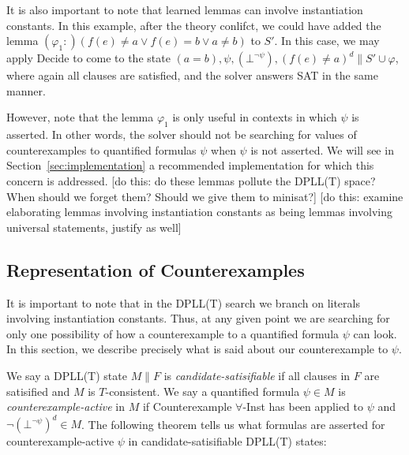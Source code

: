 \documentclass{llncs}
\begin{document}
It is also important to note that learned lemmas can involve instantiation constants.
In this example, after the theory conlifct, we could have added the lemma $(\varphi_1 : ) ( f( e ) \neq a \vee f( e ) = b \vee a \neq b )$ to $S'$.
In this case, we may apply Decide to come to the state $( a = b ), \psi, (\bot^{\neg \psi}), (f( e ) \neq a)^d \parallel S' \cup \varphi$, where again all clauses are satisfied, and the solver answers SAT in the same manner.

However, note that the lemma $\varphi_1$ is only useful in contexts in which $\psi$ is asserted.
In other words, the solver should not be searching for values of counterexamples to quantified formulas $\psi$ when $\psi$ is not asserted.
We will see in Section~\ref{sec:implementation} a recommended implementation for which this concern is addressed.
[do this: do these lemmas pollute the DPLL(T) space?  When should we forget them?  Should we give them to minisat?]
[do this: examine elaborating lemmas involving instantiation constants as being lemmas involving universal statements, justify as well]

\subsection{Representation of Counterexamples}

It is important to note that in the DPLL(T) search we branch on literals involving instantiation constants.
Thus, at any given point we are searching for only one possibility of how a counterexample to a quantified formula $\psi$ can look.
In this section, we describe precisely what is said about our counterexample to $\psi$.

We say a DPLL(T) state $M \parallel F$ is \emph{candidate-satisifiable} if all clauses in $F$ are satisified and $M$ is $T$-consistent.
We say a quantified formula $\psi \in M$ is \emph{counterexample-active} in $M$ if Counterexample $\forall$-Inst has been applied to $\psi$ and $\neg (\bot^{\neg \psi})^d \in M$.
The following theorem tells us what formulas are asserted for counterexample-active $\psi$ in candidate-satisifiable DPLL(T) states:
\end{document}
